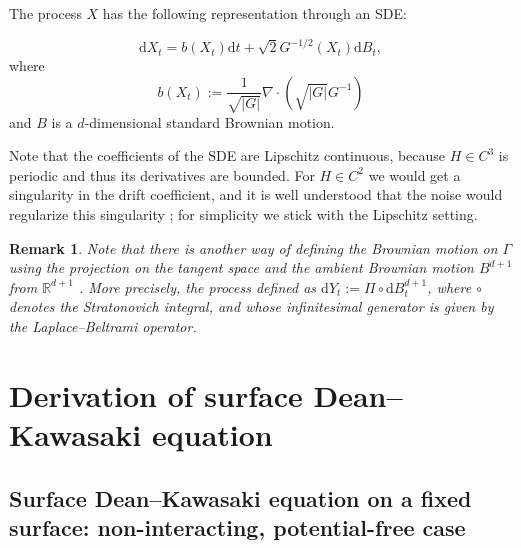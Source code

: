 \documentclass[11pt, a4paper]{article}
\newcommand{\cdummy}{\cdot}
\newcommand{\mathd}{\mathrm{d}}
\newtheorem{remark}[theorem]{Remark}%
\begin{document}
The process $X$ has the following representation through an SDE:

\begin{equation}\label{eq:BMonSurface}
    \mathd X_t = b(X_t) \mathd t + \sqrt{2}
   G^{- 1 / 2} (X_t) \mathd B_t,
   \end{equation}
where 
\begin{equation}\label{b}
    b(X_t):=\frac{1}{\sqrt{| G |}} \nabla \cdummy \left(
   \sqrt{| G |} G^{- 1} \right)
\end{equation}
and $B$ is a $d$-dimensional standard Brownian motion.

   

Note that the coefficients of the SDE are Lipschitz continuous, because $H 
\in C^3$ is periodic and thus its derivatives are bounded. For $H \in C^2$ we would get a singularity in the drift coefficient, and it is well understood that the noise would regularize this singularity \cite{Veretennikov1981}; for simplicity we stick with the Lipschitz setting.


\begin{remark} \label{rem:StrBM}
    Note that there is another way of defining the Brownian motion on $\Gamma$ using the projection on the tangent space and the ambient Brownian motion $B^{d+1}$ from $\mathbb{R}^{d+1}$ \cite[Example 8.4]{EVanden-Eijnden}. More precisely, the process defined as $\mathd Y_t := \Pi \circ \mathd B^{d+1}_t$, where $\circ$ denotes the Stratonovich integral, and whose infinitesimal generator is given by the Laplace--Beltrami operator.%
\end{remark}



\section{Derivation of surface Dean--Kawasaki equation}\label{sec:derivation}

\subsection{Surface Dean--Kawasaki equation on a fixed surface: non-interacting, potential-free case}
\end{document}
